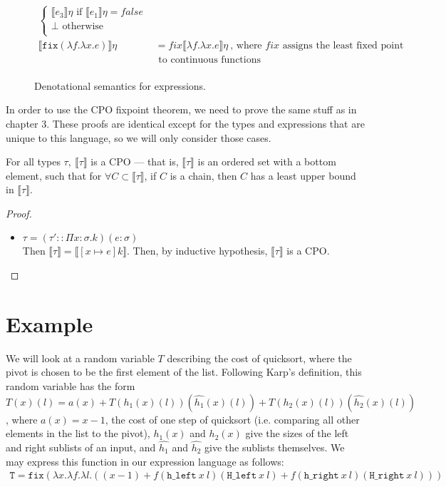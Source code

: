 \begin{figure}
\begin{align*}
\begin{cases}
      \llbracket e_3 \rrbracket\eta \text{ if } \llbracket e_1 \rrbracket\eta = false \\
      \perp \text{      otherwise} \\
   \end{cases}
  \\
   \llbracket  \texttt{fix} (\lambda f.\lambda x.e) \rrbracket\eta &= fix\llbracket \lambda f.\lambda x.e \rrbracket\eta \
 \text{, where } fix \text{ assigns the least fixed point} \\ 
 &\text{ \ \ \ \ \ \ \ \ \ \ \ \ \ \ \ \ \ \ \ \ \ \ \ to continuous functions} \\
 \end{align*}
 \caption{Denotational semantics for expressions.}
 \end{figure}
 
 In order to use the CPO fixpoint theorem, we need to prove the same stuff as in chapter 3. These proofs are 
 identical except for the types and expressions that are unique to this language, so we will only consider those cases.
 
 \begin{thm}
For all types $\tau, \ \llbracket \tau \rrbracket$ is a CPO --- that is, $\llbracket \tau \rrbracket$ is an ordered 
set with a bottom element, such that for $\forall C \subset \llbracket \tau \rrbracket$, if  $C$ is a chain, then $C$ has a least 
upper bound in $\llbracket \tau \rrbracket$. \\
\end{thm}
\begin{proof}
\begin{itemize}
\item $\tau = (\tau' :: \Pi x:\sigma.k)(e : \sigma) $ \\
Then $\llbracket \tau \rrbracket = \llbracket [x \mapsto e]k\rrbracket$. Then, by inductive hypothesis, $\llbracket \tau \rrbracket$ is a CPO.
\end{itemize}
\end{proof}

\section{Example}
We will look at a random variable $T$ describing the cost of quicksort, where the pivot is chosen to be the first element 
of the list. Following Karp's definition, this random variable has the form $T(x)(l) = a(x) + T(h_1(x)(l))(\hat{h_1}(x)(l))
+ T(h_2(x)(l))(\hat{h_2}(x)(l))$, where $a(x) = x-1$, the cost of one step of quicksort (i.e. comparing all other elements
in the list to the pivot), $h_1(x)$ and $h_2(x)$ give the sizes of the left and right sublists of an input, and
$\hat{h_1}$ and $\hat{h_2}$ give the sublists themselves. We may express this function in our expression language
as follows:
\begin{align*}
\texttt{T} = \texttt{fix}(\lambda x. \lambda f. \lambda l. ((x-1) 
		+ f(\texttt{h\_left} \ x \ l)(\texttt{H\_left} \ x \ l) + f(\texttt{h\_right} \ x \ l)(\texttt{H\_right} \ x \ l)))
\end{align*}
 
